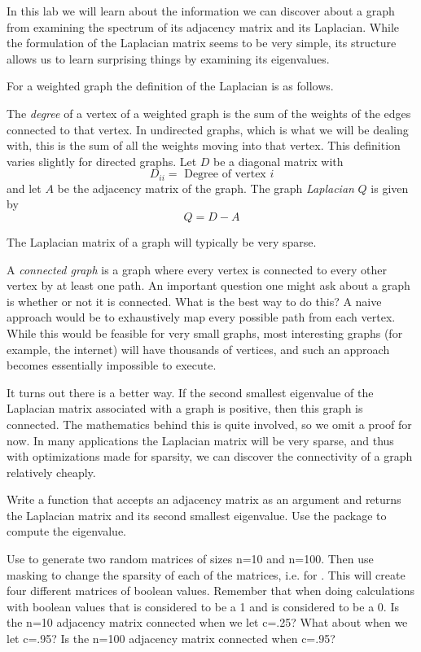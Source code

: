 In this lab we will learn about the information we can discover about a graph from examining the spectrum of its adjacency matrix and its Laplacian.
While the formulation of the Laplacian matrix seems to be very simple, its structure allows us to learn surprising things by examining its eigenvalues.

For a weighted graph the definition of the Laplacian is as follows.

\begin{definition}  The \emph{degree} of a vertex of a weighted graph is the sum of the weights of the edges connected to that vertex.
In undirected graphs, which is what we will be dealing with, this is the sum of all the weights moving into that vertex.
This definition varies slightly for directed graphs.
Let $D$ be a diagonal matrix with
\[
D_{ii} = \mbox{ Degree of vertex $i$}
\]
and let $A$ be the adjacency matrix of the graph.
The graph \emph{Laplacian} $Q$ is given by
\[
Q = D-A
\]
\end{definition}

The Laplacian matrix of a graph will typically be very sparse.

A \emph{connected graph} is a graph where every vertex is connected to every other vertex by at least one path.
An important question one might ask about a graph is whether or not it is connected.
What is the best way to do this?
A naive approach would be to exhaustively map every possible path from each vertex.
While this would be feasible for very small graphs, most interesting graphs (for example, the internet) will have thousands of vertices, and such an approach becomes essentially impossible to execute.

It turns out there is a better way.
If the second smallest eigenvalue of the Laplacian matrix associated with a graph is positive, then this graph is connected.
The mathematics behind this is quite involved, so we omit a proof for now.
In many applications the Laplacian matrix will be very sparse, and thus with optimizations made for sparsity, we can discover the connectivity of a graph relatively cheaply.

\begin{problem}Write a function  that accepts an adjacency matrix as an argument and returns the Laplacian matrix and its second smallest eigenvalue.
Use the  package to compute the eigenvalue.

Use  to generate two random matrices of sizes n=10 and n=100.
Then use masking to change the sparsity of each of the matrices, i.e.  for . This will create four different matrices of boolean values. Remember that when doing calculations with boolean values that  is considered to be a 1 and  is considered to be a 0. Is the n=10 adjacency matrix connected when we let c=.25? What about when we let c=.95? Is the n=100 adjacency matrix connected when c=.95?
\end{problem}


